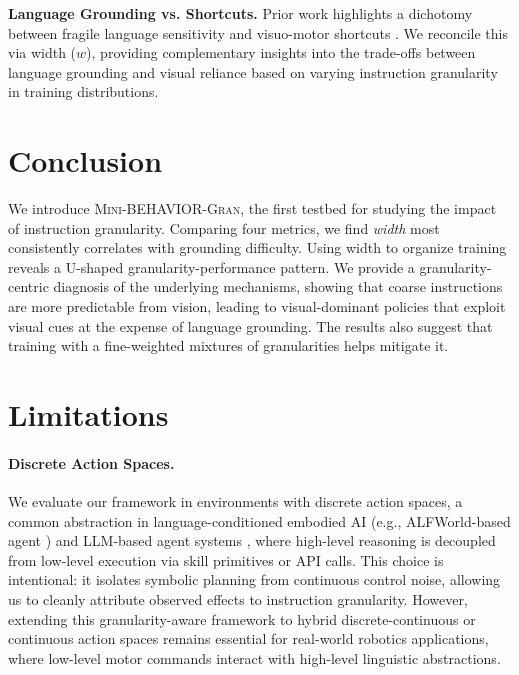 \documentclass[11pt]{article}
\begin{document}
\noindent\textbf{Language Grounding vs. Shortcuts.} 
Prior work highlights a dichotomy between fragile language sensitivity \citep{akula-etal-2022-alfred} and visuo-motor shortcuts \citep{xing2025shortcut, zhang2026restoringlinguisticgroundingvla}. We reconcile this via width ($w$), providing complementary insights into the trade-offs between language grounding and visual reliance based on varying instruction granularity in training distributions.


\section{Conclusion}
\label{sec:conclusion}


We introduce \textsc{Mini-BEHAVIOR-Gran}, the first testbed for studying the impact of instruction granularity. Comparing four metrics, we find \emph{width} most consistently correlates with grounding difficulty. Using width to organize training reveals a U-shaped granularity-performance pattern. We provide a granularity-centric diagnosis of the underlying mechanisms, showing that coarse instructions are more predictable from vision, leading to visual-dominant policies that exploit visual cues at the expense of language grounding. The results also suggest that training with a fine-weighted mixtures of granularities helps mitigate it.

\section{Limitations}
\label{sec:limitations}

\paragraph{Discrete Action Spaces.} We evaluate our framework in environments with discrete action spaces, a common abstraction in language-conditioned embodied AI (e.g., ALFWorld-based agent \citep{xiong-etal-2025-mpo, kim-etal-2025-reflact}) and LLM-based agent systems \citep{DBLP:conf/iclr/QinLYZYLLCTQZHT24, DBLP:conf/nips/PatilZ0G24}, where high-level reasoning is decoupled from low-level execution via skill primitives or API calls. This choice is intentional: it isolates symbolic planning from continuous control noise, allowing us to cleanly attribute observed effects to instruction granularity. However, extending this granularity-aware framework to hybrid discrete-continuous or continuous action spaces remains essential for real-world robotics applications, where low-level motor commands interact with high-level linguistic abstractions.
\end{document}
